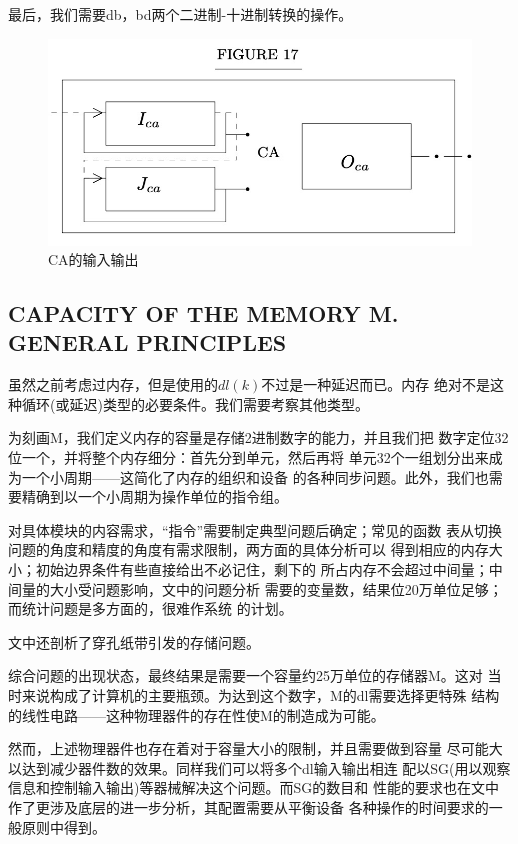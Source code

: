 \documentclass[UTF8]{ctexart}
\begin{document}
最后，我们需要db，bd两个二进制-十进制转换的操作。

\begin{figure}[H]
\centering
\includegraphics[width=\textwidth]{./pics/15.jpeg}
\caption{CA的输入输出}
\end{figure}

\subsection{CAPACITY OF THE MEMORY M. GENERAL PRINCIPLES}

虽然之前考虑过内存，但是使用的$dl(k)$不过是一种延迟而已。内存
绝对不是这种循环(或延迟)类型的必要条件。我们需要考察其他类型。

为刻画M，我们定义内存的容量是存储2进制数字的能力，并且我们把
数字定位32位一个，并将整个内存细分：首先分到单元，然后再将
单元32个一组划分出来成为一个小周期——这简化了内存的组织和设备
的各种同步问题。此外，我们也需要精确到以一个小周期为操作单位的指令组。

对具体模块的内容需求，“指令”需要制定典型问题后确定；常见的函数
表从切换问题的角度和精度的角度有需求限制，两方面的具体分析可以
得到相应的内存大小；初始边界条件有些直接给出不必记住，剩下的
所占内存不会超过中间量；中间量的大小受问题影响，文中的问题分析
需要的变量数，结果位20万单位足够；而统计问题是多方面的，很难作系统
的计划。

文中还剖析了穿孔纸带引发的存储问题。

综合问题的出现状态，最终结果是需要一个容量约25万单位的存储器M。这对
当时来说构成了计算机的主要瓶颈。为达到这个数字，M的dl需要选择更特殊
结构的线性电路——这种物理器件的存在性使M的制造成为可能。

然而，上述物理器件也存在着对于容量大小的限制，并且需要做到容量
尽可能大以达到减少器件数的效果。同样我们可以将多个dl输入输出相连
配以SG(用以观察信息和控制输入输出)等器械解决这个问题。而SG的数目和
性能的要求也在文中作了更涉及底层的进一步分析，其配置需要从平衡设备
各种操作的时间要求的一般原则中得到。
\end{document}
